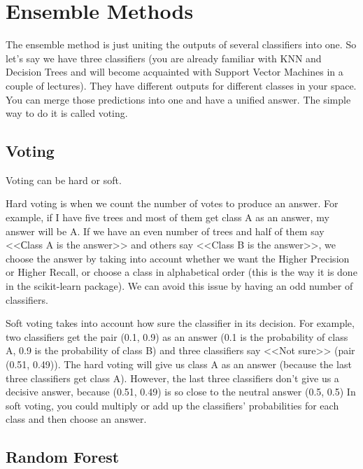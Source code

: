 \chapter{Ensemble Methods}

{\sf The ensemble method is just uniting the outputs of several classifiers into one. So let's say we have three classifiers (you are already familiar with KNN and Decision Trees and will become acquainted with Support Vector Machines in a couple of lectures). They have different outputs for different classes in your space. You can merge those predictions into one and have a unified answer. The simple way to do it is called voting.}

\section{Voting}

 Voting can be hard or soft.

 Hard voting is when we count the number of votes to produce an answer. For example, if I have five trees and most of them get class A as an answer, my answer will be A. If we have an even number of trees and half of them say <<Сlass A is the answer>> and others say <<Class B is the answer>>, we choose the answer by taking into account whether we want the Higher Precision or Higher Recall, or choose a class in alphabetical order (this is the way it is done in the scikit-learn package). We can avoid this issue by having an odd number of classifiers.

 Soft voting takes into account how sure the classifier in its decision. For example, two classifiers get the pair (0.1, 0.9) as an answer (0.1 is the probability of class A, 0.9 is the probability of class B) and three classifiers say <<Not sure>> (pair (0.51, 0.49)). The hard voting will give us class A as an answer (because the last three classifiers get class A). However, the last three classifiers don't give us a decisive answer, because (0.51, 0.49) is so close to the neutral answer (0.5, 0.5) In soft voting, you could multiply or add up the classifiers' probabilities for each class and then choose an answer.

\section{Random Forest}

